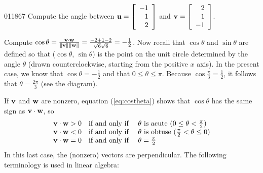 \begin{example}{}{011867}
Compute the angle between 
$\textbf{u} = \left[
\begin{array}{r}
-1 \\
1 \\
2
\end{array}
\right]$ 
and 
$\textbf{v} = \left[
\begin{array}{r}
2 \\
1 \\
-1
\end{array}
\right]$.


\begin{wrapfigure}[7]{l}{5cm}
\vspace*{-2em}
\centering

\end{wrapfigure}

\setlength{\rightskip}{0pt plus 200pt}
\begin{solution}
 Compute $\cos\theta = \tfrac{\textbf{v} \cdot \textbf{w}}{\| \textbf{v} \| \| \textbf{w} \|} = \tfrac{-2 + 1 -2}{\sqrt{6}\sqrt{6}} = -\tfrac{1}{2}$. Now recall that $\cos\theta$ and $\sin \theta$ are defined so that ($\cos \theta$, $\sin \theta$) is the point on the unit circle determined by the angle $\theta$ (drawn counterclockwise, starting from the positive $x$ axis). In the present case, we know that $\cos \theta = -\frac{1}{2}$ and that $0 \leq \theta \leq \pi$. Because $\cos\frac{\pi}{3} = \frac{1}{2}$, it follows that $\theta = \frac{2\pi}{3}$ (see the diagram).
\vspace{2em}
\end{solution}
\end{example}

If $\textbf{v}$ and $\textbf{w}$ are nonzero, equation (\ref{eq:costheta}) shows that $\cos \theta$ has the same sign as $\textbf{v} \cdot \textbf{w}$, so
\begin{equation*}
\begin{array}{lll}
\textbf{v} \cdot \textbf{w} > 0 & \mbox{if and only if } & \theta \mbox{ is acute } (0 \leq \theta < \tfrac{\pi}{2}) \\
\textbf{v} \cdot \textbf{w} < 0 & \mbox{if and only if } & \theta \mbox{ is obtuse } (\tfrac{\pi}{2} < \theta \leq 0) \\
\textbf{v} \cdot \textbf{w} = 0 & \mbox{if and only if } & \theta = \tfrac{\pi}{2}
\end{array}
\end{equation*}
In this last case, the (nonzero) vectors are perpendicular. The following terminology is used in linear algebra:


